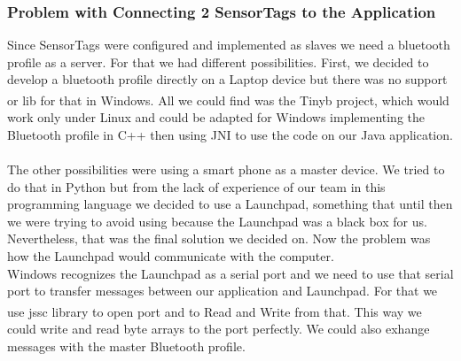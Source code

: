 \documentclass[hidelinks,conference,12pt]{IEEETran}
\begin{document}
\subsubsection{Problem with Connecting 2 SensorTags to the Application}
Since SensorTags were configured and implemented as slaves we need a bluetooth profile as a server. For that we had different possibilities. First, we decided to develop a bluetooth profile directly on a Laptop device but there was no support or lib for that in Windows. All we could find was the Tinyb\textsuperscript{\cite{tinyb}} project, which would work only under Linux and could be adapted for Windows implementing the Bluetooth profile in C++ then using JNI to use the code on our Java application.\\\\
The other possibilities were using a smart phone as a master device. We tried to do that in Python but from the lack of experience of our team in this programming language we decided to use a Launchpad, something that until then we were trying to avoid using because the Launchpad was a black box for us. Nevertheless, that was the final solution we decided on. Now the problem was how the Launchpad would communicate with the computer.\\
Windows recognizes the Launchpad as a serial port and we need to use that serial port to transfer messages between our application and Launchpad. For that we use jssc\textsuperscript{\cite{javasimpconn}} library to open port and to Read and Write from that. This way we could write and read byte arrays to the port perfectly. We could also exhange messages with the master Bluetooth profile.
\end{document}
